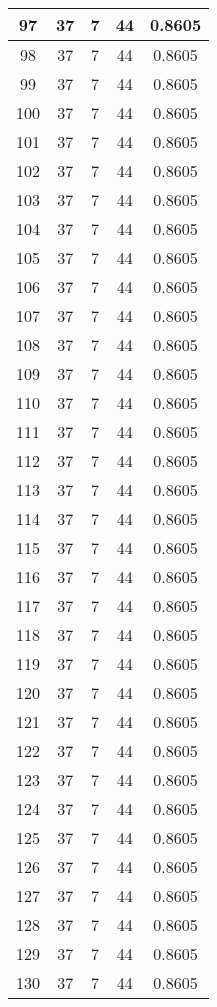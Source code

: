 \documentclass[letterpaper, 12pt]{article}
\begin{document}
\begin{longtable}{|c|c|c|c|c|}
\hline
97 & 37 & 7 & 44 & 0.8605 \\
\hline
98 & 37 & 7 & 44 & 0.8605 \\
\hline
99 & 37 & 7 & 44 & 0.8605 \\
\hline
100 & 37 & 7 & 44 & 0.8605 \\
\hline
101 & 37 & 7 & 44 & 0.8605 \\
\hline
102 & 37 & 7 & 44 & 0.8605 \\
\hline
103 & 37 & 7 & 44 & 0.8605 \\
\hline
104 & 37 & 7 & 44 & 0.8605 \\
\hline
105 & 37 & 7 & 44 & 0.8605 \\
\hline
106 & 37 & 7 & 44 & 0.8605 \\
\hline
107 & 37 & 7 & 44 & 0.8605 \\
\hline
108 & 37 & 7 & 44 & 0.8605 \\
\hline
109 & 37 & 7 & 44 & 0.8605 \\
\hline
110 & 37 & 7 & 44 & 0.8605 \\
\hline
111 & 37 & 7 & 44 & 0.8605 \\
\hline
112 & 37 & 7 & 44 & 0.8605 \\
\hline
113 & 37 & 7 & 44 & 0.8605 \\
\hline
114 & 37 & 7 & 44 & 0.8605 \\
\hline
115 & 37 & 7 & 44 & 0.8605 \\
\hline
116 & 37 & 7 & 44 & 0.8605 \\
\hline
117 & 37 & 7 & 44 & 0.8605 \\
\hline
118 & 37 & 7 & 44 & 0.8605 \\
\hline
119 & 37 & 7 & 44 & 0.8605 \\
\hline
120 & 37 & 7 & 44 & 0.8605 \\
\hline
121 & 37 & 7 & 44 & 0.8605 \\
\hline
122 & 37 & 7 & 44 & 0.8605 \\
\hline
123 & 37 & 7 & 44 & 0.8605 \\
\hline
124 & 37 & 7 & 44 & 0.8605 \\
\hline
125 & 37 & 7 & 44 & 0.8605 \\
\hline
126 & 37 & 7 & 44 & 0.8605 \\
\hline
127 & 37 & 7 & 44 & 0.8605 \\
\hline
128 & 37 & 7 & 44 & 0.8605 \\
\hline
129 & 37 & 7 & 44 & 0.8605 \\
\hline
130 & 37 & 7 & 44 & 0.8605 \\

\end{longtable}
\end{document}

